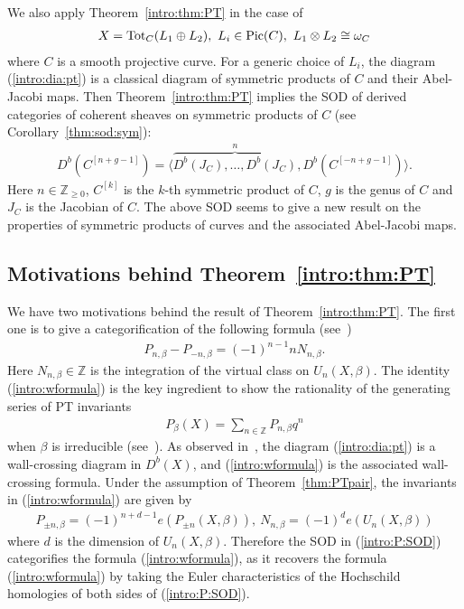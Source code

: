 \documentclass[11pt]{amsart}
\theoremstyle{plain}
\newcommand{\Pic}{\mathop{\rm Pic}\nolimits}
\begin{document}
We also apply Theorem~\ref{intro:thm:PT}
in the case of 
\begin{align*}
X=\mathrm{Tot}_C(L_1 \oplus L_2), \ L_i \in \Pic(C), \
L_1 \otimes L_2 \cong \omega_C
\end{align*}
where $C$ is a smooth projective curve. 
For a generic choice of $L_i$, 
the diagram (\ref{intro:dia:pt})
is a classical diagram of symmetric products of
$C$ and their Abel-Jacobi maps. 
Then 
Theorem~\ref{intro:thm:PT} implies 
the SOD of derived categories of coherent sheaves on 
 symmetric products
of $C$ (see Corollary~\ref{thm:sod:sym}):
\begin{align*}
D^b(C^{[n+g-1]})=
\langle \overbrace{D^b(J_C), \ldots, 
D^b(J_C)}^{n}, D^b(C^{[-n+g-1]}) \rangle. 
\end{align*}
Here $n\in \mathbb{Z}_{\ge 0}$, 
$C^{[k]}$ is the $k$-th symmetric product of $C$, 
$g$ is the genus of $C$
and $J_C$ is the Jacobian of $C$. 
The above SOD seems to give a new result on 
the properties of symmetric products of curves and the 
associated Abel-Jacobi maps. 


\subsection{Motivations behind Theorem~\ref{intro:thm:PT}}
We have two 
motivations behind the result of 
 Theorem~\ref{intro:thm:PT}. 
The first one is
to give 
a categorification of the following formula 
(see~\cite{PT3, Tsurvey})
\begin{align}\label{intro:wformula}
P_{n, \beta}-P_{-n, \beta}=(-1)^{n-1} n N_{n, \beta}.
\end{align}
Here $N_{n, \beta} \in \mathbb{Z}$ is the 
integration of the virtual class on $U_n(X, \beta)$. 
The identity (\ref{intro:wformula}) 
is the key ingredient to 
show the rationality of the generating series 
of PT invariants
\begin{align*}
P_{\beta}(X)=
\sum_{n \in \mathbb{Z}} P_{n, \beta}q^n
\end{align*}
when $\beta$ is irreducible
(see~\cite{PT3}). 
As observed in~\cite{Tsurvey}, 
the diagram (\ref{intro:dia:pt}) is 
a wall-crossing diagram in $D^b(X)$, 
and (\ref{intro:wformula}) is 
the associated wall-crossing formula.  
Under the assumption of Theorem~\ref{thm:PTpair}, 
the invariants in (\ref{intro:wformula})
are given by 
\begin{align*}
P_{\pm n, \beta}=(-1)^{n+d-1}e(P_{\pm n}(X, \beta)), \ 
N_{n, \beta}=(-1)^d e(U_n(X, \beta))
\end{align*}
where $d$ is the dimension of $U_n(X, \beta)$. 
Therefore the SOD in (\ref{intro:P:SOD})
categorifies the formula (\ref{intro:wformula}), 
as it 
recovers the formula (\ref{intro:wformula})
by taking the Euler characteristics of the Hochschild 
homologies of both sides of (\ref{intro:P:SOD}). 
\end{document}
